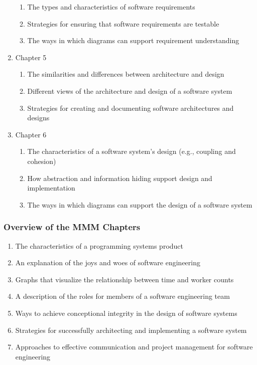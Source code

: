 \documentclass[11pt]{article}
\begin{document}
\begin{enumerate}
    \begin{enumerate}
      \itemsep 0in
      \item The types and characteristics of software requirements
      \item Strategies for ensuring that software requirements are testable
      \item The ways in which diagrams can support requirement understanding
    \end{enumerate}

  \item Chapter 5

    \begin{enumerate}
      \itemsep 0in
      \item The similarities and differences between architecture and design
      \item Different views of the architecture and design of a software system
      \item Strategies for creating and documenting software architectures and designs
    \end{enumerate}

  \item Chapter 6

    \begin{enumerate}
      \itemsep 0in
      \item The characteristics of a software system's design (e.g., coupling
        and cohesion)
      \item How abstraction and information hiding support design and
        implementation
      \item The ways in which diagrams can support the design of a software
        system
    \end{enumerate}

\end{enumerate}

\vspace*{-1em}

\subsubsection*{Overview of the MMM Chapters}

\begin{enumerate}
  \itemsep 0in
  \item The characteristics of a programming systems product
  \item An explanation of the joys and woes of software engineering
  \item Graphs that visualize the relationship between time and worker counts
  \item A description of the roles for members of a software engineering team
  \item Ways to achieve conceptional integrity in the design of software systems
  \item Strategies for successfully architecting and implementing a software
    system
  \item Approaches to effective communication and project management for
    software engineering
\end{enumerate}
\end{document}
